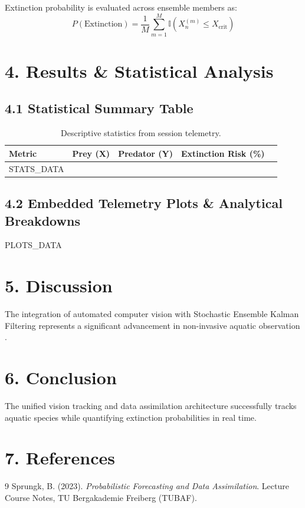 \documentclass[11pt,a4paper]{article}
\begin{document}
Extinction probability is evaluated across ensemble members as:
\begin{equation}
P(\text{Extinction}) = \frac{1}{M} \sum_{m=1}^M \mathbb{I}\left(X_n^{(m)} \le X_{\text{crit}}\right)
\end{equation}

\section*{4. Results \& Statistical Analysis}
\subsection*{4.1 Statistical Summary Table}
\begin{table}[h!]
\centering
\begin{tabular}{lcccc}
\toprule
\textbf{Metric} & \textbf{Prey (X)} & \textbf{Predator (Y)} & \textbf{Extinction Risk (\%)} \\
\midrule
{{STATS_DATA}}
\bottomrule
\end{tabular}
\caption{Descriptive statistics from session telemetry.}
\end{table}

\subsection*{4.2 Embedded Telemetry Plots \& Analytical Breakdowns}
{{PLOTS_DATA}}

\section*{5. Discussion}
The integration of automated computer vision with Stochastic Ensemble Kalman Filtering represents a significant advancement in non-invasive aquatic observation \cite{sprungk2023}.

\section*{6. Conclusion}
The unified vision tracking and data assimilation architecture successfully tracks aquatic species while quantifying extinction probabilities in real time.

\section*{7. References}
\begin{thebibliography}{9}
     Sprungk, B. (2023). \textit{Probabilistic Forecasting and Data Assimilation}. Lecture Course Notes, TU Bergakademie Freiberg (TUBAF).
\end{thebibliography}
\end{document}
